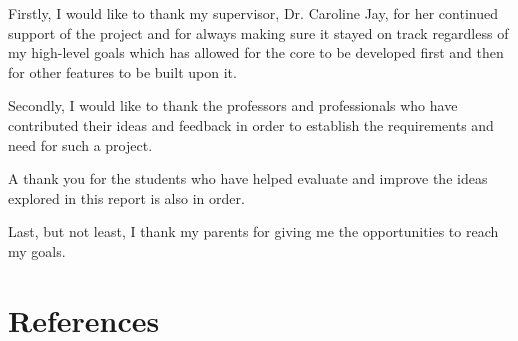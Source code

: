 \documentclass[12pt]{article}
\begin{document}
Firstly, I would like to thank my supervisor, Dr. Caroline Jay, for her continued support of the project and for always making sure it stayed on track regardless of my high-level goals which has allowed for the core to be developed first and then for other features to be built upon it.

Secondly, I would like to thank the professors and professionals who have contributed their ideas and feedback in order to establish the requirements and need for such a project. 

A thank you for the students who have helped evaluate and improve the ideas explored in this report is also in order.

Last, but not least, I thank my parents for giving me the opportunities to reach my goals.

\newpage

\tableofcontents

\newpage


\listoffigures


\newpage

\listoflistings


\newpage













\section{References}

\printbibliography[title={~}]
\end{document}
